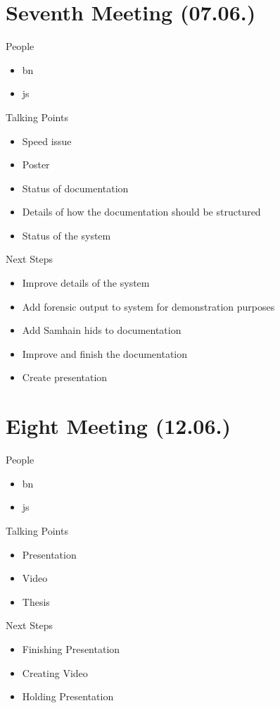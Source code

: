 \section{Seventh Meeting (07.06.)}
\label{sec:meeting07}

People
\begin{itemize}
    \item \gls{bn}
    \item \gls{js}
\end{itemize}

Talking Points
\begin{itemize}
    \item Speed issue
    \item Poster
    \item Status of documentation
    \item Details of how the documentation should be structured
    \item Status of the system
\end{itemize}

Next Steps
\begin{itemize}
    \item Improve details of the system
    \item Add forensic output to system for demonstration purposes
    \item Add Samhain \gls{hids} to documentation
    \item Improve and finish the documentation
    \item Create presentation 
\end{itemize}

\section{Eight Meeting (12.06.)}
\label{sec:meeting08}

People
\begin{itemize}
    \item \gls{bn}
    \item \gls{js}
\end{itemize}

Talking Points
\begin{itemize}
    \item Presentation
    \item Video
    \item Thesis
\end{itemize}

Next Steps
\begin{itemize}
    \item Finishing Presentation
    \item Creating Video
    \item Holding Presentation
\end{itemize}
